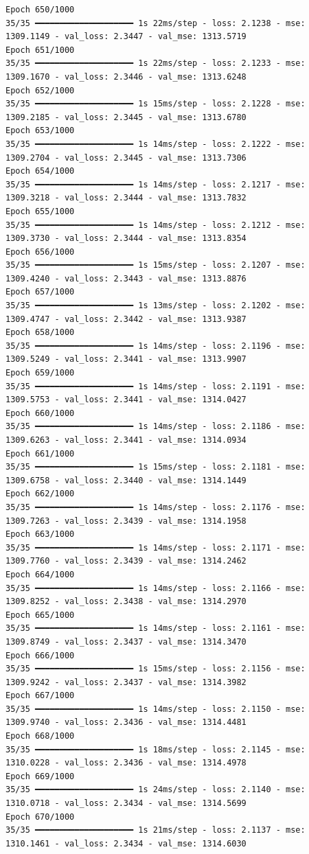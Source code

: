 \documentclass[
  letterpaper,
  DIV=11,
  numbers=noendperiod]{scrreprt}
\begin{document}
\begin{verbatim}
Epoch 650/1000
35/35 ━━━━━━━━━━━━━━━━━━━━ 1s 22ms/step - loss: 2.1238 - mse: 1309.1149 - val_loss: 2.3447 - val_mse: 1313.5719
Epoch 651/1000
35/35 ━━━━━━━━━━━━━━━━━━━━ 1s 22ms/step - loss: 2.1233 - mse: 1309.1670 - val_loss: 2.3446 - val_mse: 1313.6248
Epoch 652/1000
35/35 ━━━━━━━━━━━━━━━━━━━━ 1s 15ms/step - loss: 2.1228 - mse: 1309.2185 - val_loss: 2.3445 - val_mse: 1313.6780
Epoch 653/1000
35/35 ━━━━━━━━━━━━━━━━━━━━ 1s 14ms/step - loss: 2.1222 - mse: 1309.2704 - val_loss: 2.3445 - val_mse: 1313.7306
Epoch 654/1000
35/35 ━━━━━━━━━━━━━━━━━━━━ 1s 14ms/step - loss: 2.1217 - mse: 1309.3218 - val_loss: 2.3444 - val_mse: 1313.7832
Epoch 655/1000
35/35 ━━━━━━━━━━━━━━━━━━━━ 1s 14ms/step - loss: 2.1212 - mse: 1309.3730 - val_loss: 2.3444 - val_mse: 1313.8354
Epoch 656/1000
35/35 ━━━━━━━━━━━━━━━━━━━━ 1s 15ms/step - loss: 2.1207 - mse: 1309.4240 - val_loss: 2.3443 - val_mse: 1313.8876
Epoch 657/1000
35/35 ━━━━━━━━━━━━━━━━━━━━ 1s 13ms/step - loss: 2.1202 - mse: 1309.4747 - val_loss: 2.3442 - val_mse: 1313.9387
Epoch 658/1000
35/35 ━━━━━━━━━━━━━━━━━━━━ 1s 14ms/step - loss: 2.1196 - mse: 1309.5249 - val_loss: 2.3441 - val_mse: 1313.9907
Epoch 659/1000
35/35 ━━━━━━━━━━━━━━━━━━━━ 1s 14ms/step - loss: 2.1191 - mse: 1309.5753 - val_loss: 2.3441 - val_mse: 1314.0427
Epoch 660/1000
35/35 ━━━━━━━━━━━━━━━━━━━━ 1s 14ms/step - loss: 2.1186 - mse: 1309.6263 - val_loss: 2.3441 - val_mse: 1314.0934
Epoch 661/1000
35/35 ━━━━━━━━━━━━━━━━━━━━ 1s 15ms/step - loss: 2.1181 - mse: 1309.6758 - val_loss: 2.3440 - val_mse: 1314.1449
Epoch 662/1000
35/35 ━━━━━━━━━━━━━━━━━━━━ 1s 14ms/step - loss: 2.1176 - mse: 1309.7263 - val_loss: 2.3439 - val_mse: 1314.1958
Epoch 663/1000
35/35 ━━━━━━━━━━━━━━━━━━━━ 1s 14ms/step - loss: 2.1171 - mse: 1309.7760 - val_loss: 2.3439 - val_mse: 1314.2462
Epoch 664/1000
35/35 ━━━━━━━━━━━━━━━━━━━━ 1s 14ms/step - loss: 2.1166 - mse: 1309.8252 - val_loss: 2.3438 - val_mse: 1314.2970
Epoch 665/1000
35/35 ━━━━━━━━━━━━━━━━━━━━ 1s 14ms/step - loss: 2.1161 - mse: 1309.8749 - val_loss: 2.3437 - val_mse: 1314.3470
Epoch 666/1000
35/35 ━━━━━━━━━━━━━━━━━━━━ 1s 15ms/step - loss: 2.1156 - mse: 1309.9242 - val_loss: 2.3437 - val_mse: 1314.3982
Epoch 667/1000
35/35 ━━━━━━━━━━━━━━━━━━━━ 1s 14ms/step - loss: 2.1150 - mse: 1309.9740 - val_loss: 2.3436 - val_mse: 1314.4481
Epoch 668/1000
35/35 ━━━━━━━━━━━━━━━━━━━━ 1s 18ms/step - loss: 2.1145 - mse: 1310.0228 - val_loss: 2.3436 - val_mse: 1314.4978
Epoch 669/1000
35/35 ━━━━━━━━━━━━━━━━━━━━ 1s 24ms/step - loss: 2.1140 - mse: 1310.0718 - val_loss: 2.3434 - val_mse: 1314.5699
Epoch 670/1000
35/35 ━━━━━━━━━━━━━━━━━━━━ 1s 21ms/step - loss: 2.1137 - mse: 1310.1461 - val_loss: 2.3434 - val_mse: 1314.6030

\end{verbatim}
\end{document}
